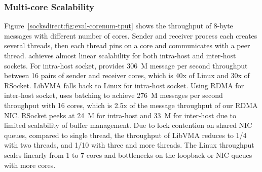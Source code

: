 \subsubsection{Multi-core Scalability}
\quad





Figure~\ref{socksdirect:fig:eval-corenum-tput} shows the throughput of 8-byte messages with different number of cores.
Sender and receiver process each creates several threads, then each thread pins on a core and communicates with a peer thread.
\sys achieves almost linear scalability for both intra-host and inter-host sockets.
For intra-host socket, \sys provides 306~M message per second throughput between 16 pairs of sender and receiver cores, which is 40x of Linux and 30x of RSocket.
LibVMA falls back to Linux for intra-host socket.
Using RDMA for inter-host socket, \sys uses batching to achieve 276~M messages per second throughput with 16 cores, which is 2.5x of the message throughput of our RDMA NIC.
RSocket peeks at 24~M for intra-host and 33~M for inter-host due to limited scalability of buffer management.
Due to lock contention on shared NIC queues, compared to single thread, the throughput of LibVMA reduces to 1/4 with two threads, and 1/10 with three and more threads.
The Linux throughput scales linearly from 1 to 7 cores and bottlenecks on the loopback or NIC queues with more cores.

